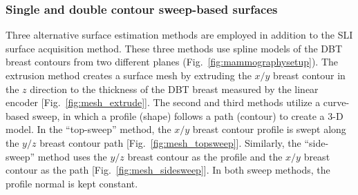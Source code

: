 \subsubsection{Single and double contour sweep-based surfaces}
Three alternative surface estimation methods are employed in addition to the SLI surface acquisition method. These three methods use spline models of the DBT breast contours from two different planes (Fig.~\ref{fig:mammographysetup}). The extrusion method creates a surface mesh by extruding the $x/y$ breast contour in the $z$ direction to the thickness of the DBT breast measured by the linear encoder [Fig.~\ref{fig:mesh_extrude}]. The second and third methods utilize a curve-based sweep, in which a profile (shape) follows a path (contour) to create a 3-D model. In the ``top-sweep'' method, the $x/y$ breast contour profile is swept along the $y/z$ breast contour path [Fig.~\ref{fig:mesh_topsweep}]. Similarly, the ``side-sweep'' method uses the $y/z$ breast contour as the profile and the $x/y$ breast contour as the path [Fig.~\ref{fig:mesh_sidesweep}]. In both sweep methods, the profile normal is kept constant.

